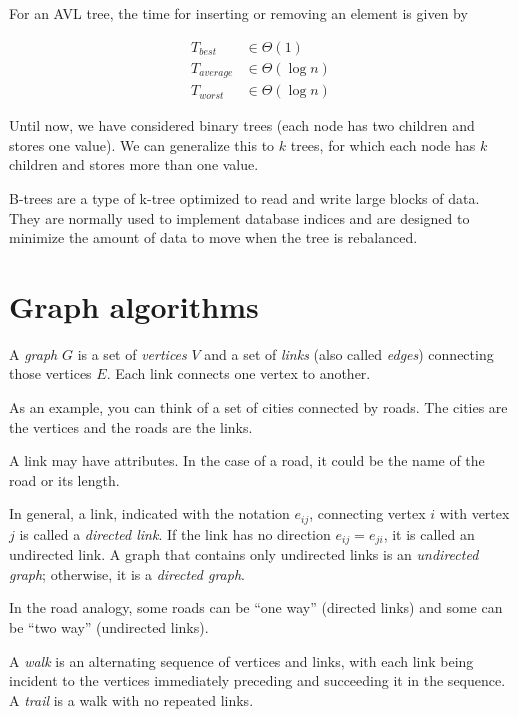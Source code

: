 \documentclass[justified,sixbynine]{tufte-book}
\theoremstyle{plain}%
\theoremstyle{definition}
\theoremstyle{remark}
\begin{document}
\begin{fullwidth}
For an AVL tree, the time for inserting or removing an element is given by

\begin{align}
T_{best} &\in \Theta (1) \\
T_{average} &\in \Theta (\log n) \\
T_{worst} &\in \Theta (\log n)
\end{align}


Until now, we have considered binary trees (each node has two children and
stores one value). We can generalize this to $k$ trees, for which each node has $k$
children and stores more than one value.

B-trees are a type of k-tree optimized to read and write large blocks of data. They are normally used to implement database indices and are designed to minimize the amount of data to move when the tree is rebalanced.

\goodbreak\section{Graph algorithms}


A {\it graph} $G$ is a set of {\it vertices} $V$ and a set of {\it links} (also called {\it edges}) connecting those vertices $E$. Each link connects one vertex to another.

As an example, you can think of a set of cities connected by roads. The cities are the vertices and the roads are the links.

A link may have attributes. In the case of a road, it could be the name of the road or its length.

In general, a link, indicated with the notation $e_{ij}$, connecting vertex $%
i $ with vertex $j$ is called a {\it directed link}. If the link has no
direction $e_{ij}=e_{ji}$, it is called an undirected link. A graph that
contains only undirected links is an {\it undirected graph}; otherwise, it is
a {\it directed graph}.

In the road analogy, some roads can be ``one way'' (directed links) and some can be ``two way'' (undirected links).

A {\it walk} is an alternating sequence of vertices and links, with each
link being incident to the vertices immediately preceding and succeeding it
in the sequence. A {\it trail} is a walk with no repeated links.


\end{fullwidth}
\end{document}
